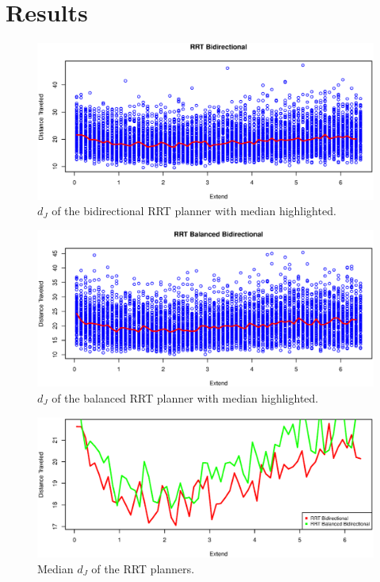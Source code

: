 \section{Results} 

\begin{figure}[h]
 \centering
 \includegraphics[width=\figsize]{graphics/bidirectional_correlation}
 \caption{\(d_J\) of the bidirectional RRT planner with median highlighted.}
 \label{fig:bidir_correlated}
\end{figure}

\begin{figure}[h]
 \centering
 \includegraphics[width=\figsize]{graphics/balanced_correlation}
 \caption{\(d_J\) of the balanced RRT planner with median highlighted.}
 \label{fig:balanced_correlated}
\end{figure}


\begin{figure}[h]
 \centering
 \includegraphics[width=\figsize]{graphics/compare_distance}
 \caption{Median \(d_J\) of the RRT planners.}
 \label{fig:balanced_correlated}
\end{figure}


